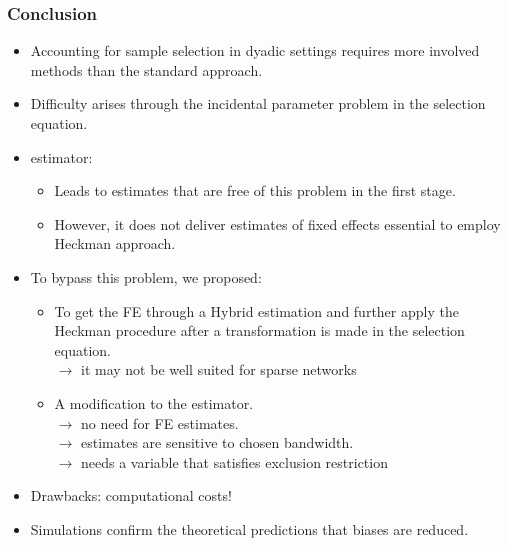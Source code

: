 \begin{frame}
    \frametitle{Conclusion}
    \begin{itemize}
        \item Accounting for sample selection in dyadic settings requires more involved methods than the standard \cite{heckman1979sample} approach.
        \item Difficulty arises through the incidental parameter problem in the selection equation.
        \item \cite{charbonneau2017multiple} estimator:
        \begin{itemize}
            \item Leads to estimates that are free of this problem in the first stage.
            \item However, it does not deliver estimates of fixed effects essential to employ Heckman approach.
        \end{itemize}
        \item To bypass this problem, we proposed:
        \begin{itemize}
            \item To get the FE through a Hybrid estimation and further apply the Heckman procedure after a transformation is made in the selection equation. \\
            $\xrightarrow{}$ it may not be well suited for sparse networks
            \item A modification to the \cite{kyriazidou1997estimation} estimator. \\
            $\xrightarrow{}$ no need for FE estimates.\\
            $\xrightarrow{}$ estimates are sensitive to chosen bandwidth. \\
            $\xrightarrow{}$ needs a variable that satisfies exclusion restriction
        \end{itemize} 
        \item Drawbacks: computational costs!
        \item Simulations confirm the theoretical predictions that biases are reduced.
    \end{itemize}
\end{frame}